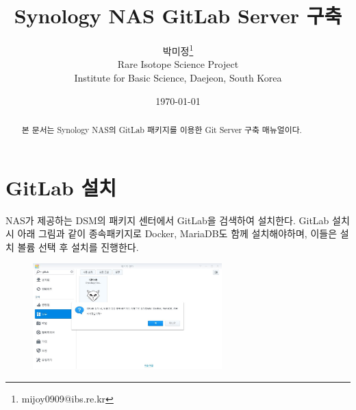 \documentclass[11pt
  , a4paper
  , article
  , oneside
]{memoir}
\begin{document}
 
\newcommand{\technumber}{
  RAON Control-Document Series\\
  Revision : v0.1,   Release : January. 08. 2016}
\title{\textbf{Synology NAS GitLab Server 구축}}

\author{박미정\thanks{mijoy0909@ibs.re.kr} \\
  Rare Isotope Science Project\\
  Institute for Basic Science, Daejeon, South Korea
}
\date{\today}


\renewcommand{\maketitlehooka}{\begin{flushright}\textsf{\technumber}\end{flushright}}

\maketitle

\begin{abstract}
본 문서는 Synology NAS의 GitLab 패키지를 이용한 Git Server 구축 매뉴얼이다.
\end{abstract}


\chapter{GitLab 설치}
NAS가 제공하는 DSM의 패키지 센터에서 GitLab을 검색하여 설치한다.
GitLab 설치 시 아래 그림과 같이 종속패키지로 Docker, MariaDB도 함께 설치해야하며, 이들은 설치 볼륨 선택 후 설치를 진행한다.
\begin{figure}[h!]
	\centering
	\includegraphics[width=0.65\textwidth]{./images/1.JPG} 
\end{figure}
\clearpage
\end{document}
